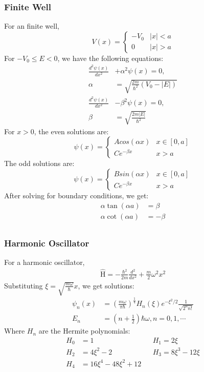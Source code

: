 \documentclass[a4paper]{article}
\newcommand{\operator}[1]{
  \ensuremath{\hat{\text{#1}}}}        %
\begin{document}
\begin{multicols*}{2}
\subsubsection{Finite Well}
For an finite well,
\[
V(x) =
\begin{cases}
  -V_0 & |x| < a \\
  0 & |x| > a
\end{cases}
\]
For $-V_0 \leq E < 0$, we have the following equations:
\begin{align*}
  \frac{d^2 \psi(x)}{dx^2} &+ \alpha^2 \psi(x) = 0, \\
  \alpha &= \sqrt{\frac{2m}{\hbar^2}(V_0 - |E|)} \\
  \frac{d^2 \psi(x)}{dx^2} &- \beta^2 \psi(x) = 0, \\
  \beta &= \sqrt{\frac{2m|E|}{\hbar^2}}
\end{align*}
For $x>0$, the even solutions are:
\[
  \psi(x)=
  \begin{cases}
    A cos(\alpha x) &x \in [0, a] \\
    C e^{-\beta x}  &x > a
  \end{cases}
\]
The odd solutions are:
\[
\psi(x)=
\begin{cases}
  B sin(\alpha x) &x \in [0, a] \\
  C e^{-\beta x}  &x > a
\end{cases}
\]
After solving for boundary conditions, we get:
\begin{align*}
  \alpha \tan(\alpha a) &= \beta \\
  \alpha \cot(\alpha a) &= -\beta \\
\end{align*}

\subsubsection{Harmonic Oscillator}
For a harmonic oscillator,
\begin{align*}
  \operator{H} = -\frac{\hbar^2}{2m} \frac{d^2}{dx^2} + \frac{m}{2}\omega^2 x^2
\end{align*}
Substituting $\xi = \sqrt{\frac{m\omega}{\hbar}}x$, we get solutions:
\begin{align*}
  \psi_n(x) &= \left( \frac{m\omega}{\pi \hbar} \right)^\frac{1}{4} H_n(\xi)
  e^{-\xi^2/2} \frac{1}{\sqrt{2^n n!}} \\
  E_n &= \left(n + \frac{1}{2}\right) \hbar \omega , n = 0,1,\cdots
\end{align*}
Where $H_n$ are the Hermite polynomials:
\begin{alignat*}{3}
  H_0 &= 1 && H_1 = 2\xi \\
  H_2 &= 4\xi^2 - 2 && H_3 = 8\xi^3 - 12\xi \\
  H_4 &= 16\xi^4 - 48\xi^2 + 12 &&
\end{alignat*}


\end{multicols*}
\end{document}
